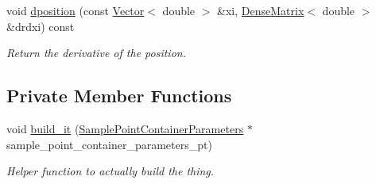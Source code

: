 \begin{DoxyCompactItemize}
void \hyperlink{classoomph_1_1MeshAsGeomObject_aed3e9376f6042fed597098c0017a2131}{dposition} (const \hyperlink{classoomph_1_1Vector}{Vector}$<$ double $>$ \&xi, \hyperlink{classoomph_1_1DenseMatrix}{Dense\+Matrix}$<$ double $>$ \&drdxi) const
\begin{DoxyCompactList}\small\item\em Return the derivative of the position. \end{DoxyCompactList}\end{DoxyCompactItemize}
\subsection*{Private Member Functions}
\begin{DoxyCompactItemize}
\item 
void \hyperlink{classoomph_1_1MeshAsGeomObject_a1d0d14e9a1acf2b865df676fd354444f}{build\+\_\+it} (\hyperlink{classoomph_1_1SamplePointContainerParameters}{Sample\+Point\+Container\+Parameters} $\ast$sample\+\_\+point\+\_\+container\+\_\+parameters\+\_\+pt)
\begin{DoxyCompactList}\small\item\em Helper function to actually build the thing. \end{DoxyCompactList}\end{DoxyCompactItemize}
